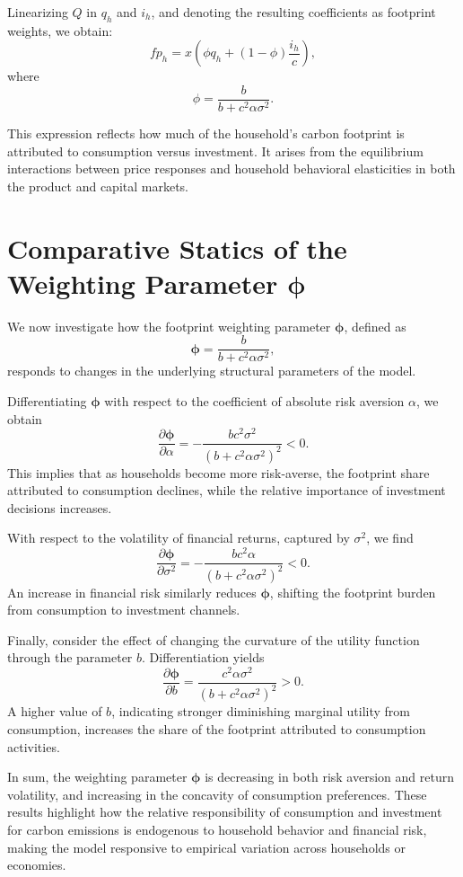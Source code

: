 \documentclass[12pt,a4paper]{article}%
\begin{document}
Linearizing \( Q \) in \( q_h \) and \( i_h \), and denoting the resulting coefficients as footprint weights, we obtain:
\[
fp_h = x \left( \phi q_h + (1 - \phi) \frac{i_h}{c} \right),
\]
where
\[
\phi = \frac{b}{b + c^2 \alpha \sigma^2}.
\]

This expression reflects how much of the household’s carbon footprint is attributed to consumption versus investment. It arises from the equilibrium interactions between price responses and household behavioral elasticities in both the product and capital markets.

\section{Comparative Statics of the Weighting Parameter \( \boldsymbol{\phi} \)}

We now investigate how the footprint weighting parameter \( \boldsymbol{\phi} \), defined as
\[
\boldsymbol{\phi} = \frac{b}{b + c^2 \alpha \sigma^2},
\]
responds to changes in the underlying structural parameters of the model.

Differentiating \( \boldsymbol{\phi} \) with respect to the coefficient of absolute risk aversion \( \alpha \), we obtain
\[
\frac{\partial \boldsymbol{\phi}}{\partial \alpha} = -\frac{b c^2 \sigma^2}{(b + c^2 \alpha \sigma^2)^2} < 0.
\]
This implies that as households become more risk-averse, the footprint share attributed to consumption declines, while the relative importance of investment decisions increases.

With respect to the volatility of financial returns, captured by \( \sigma^2 \), we find
\[
\frac{\partial \boldsymbol{\phi}}{\partial \sigma^2} = -\frac{b c^2 \alpha}{(b + c^2 \alpha \sigma^2)^2} < 0.
\]
An increase in financial risk similarly reduces \( \boldsymbol{\phi} \), shifting the footprint burden from consumption to investment channels.

Finally, consider the effect of changing the curvature of the utility function through the parameter \( b \). Differentiation yields
\[
\frac{\partial \boldsymbol{\phi}}{\partial b} = \frac{c^2 \alpha \sigma^2}{(b + c^2 \alpha \sigma^2)^2} > 0.
\]
A higher value of \( b \), indicating stronger diminishing marginal utility from consumption, increases the share of the footprint attributed to consumption activities.

In sum, the weighting parameter \( \boldsymbol{\phi} \) is decreasing in both risk aversion and return volatility, and increasing in the concavity of consumption preferences. These results highlight how the relative responsibility of consumption and investment for carbon emissions is endogenous to household behavior and financial risk, making the model responsive to empirical variation across households or economies.
\end{document}
